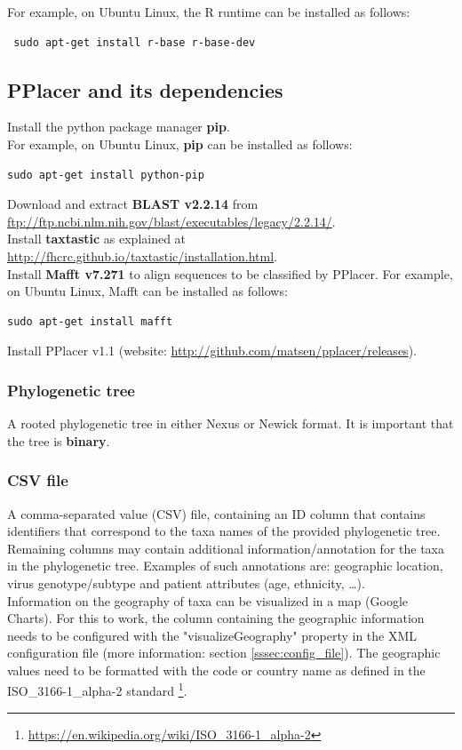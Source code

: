 \documentclass[a4paper, 11pt]{article} %
\begin{document}
\noindent For example, on Ubuntu Linux, the R runtime can be installed as follows:
\begin{verbatim}
 sudo apt-get install r-base r-base-dev
\end{verbatim}

\subsection*{PPlacer and its dependencies}
 Install the python package manager \textbf{pip}. \\

\noindent For example, on Ubuntu Linux, \textbf{pip} can be installed as follows:
\begin{verbatim}
sudo apt-get install python-pip
\end{verbatim}

\noindent Download and extract \textbf{BLAST v2.2.14} from \url{ftp://ftp.ncbi.nlm.nih.gov/blast/executables/legacy/2.2.14/}.\\

\noindent Install \textbf{taxtastic} as explained at \url{http://fhcrc.github.io/taxtastic/installation.html}.\\

\noindent Install \textbf{Mafft v7.271} to align sequences to be classified by PPlacer. 
For example, on Ubuntu Linux, Mafft can be installed as follows:
\begin{verbatim}
sudo apt-get install mafft
\end{verbatim}

\noindent Install PPlacer v1.1 (website: \url{http://github.com/matsen/pplacer/releases}).

\subsubsection*{Phylogenetic tree}
A rooted phylogenetic tree in either Nexus or Newick format. It is important that the tree is \textbf{binary}.

\subsubsection*{CSV file}
A comma-separated value (CSV) file, containing an ID column that contains identifiers that correspond to the taxa names of the provided phylogenetic tree.
Remaining columns may contain additional information/annotation for the taxa in the phylogenetic tree. 
Examples of such annotations are: geographic location, virus genotype/subtype and patient attributes (age, ethnicity, \ldots). \\
Information on the geography of taxa can be visualized in a map (Google Charts). 
For this to work, the column containing the geographic information needs to be configured with the "visualizeGeography" property in the XML configuration file (more information: section \ref{sssec:config_file}). 
The geographic values need to be formatted with the code or country name as defined in the ISO\_3166-1\_alpha-2 standard \footnote{\url{https://en.wikipedia.org/wiki/ISO\_3166-1\_alpha-2}}.
\end{document}
